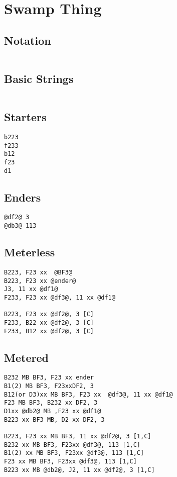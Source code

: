\documentclass[main.tex MB]{subfiles}
\begin{document}
\chapter{Swamp Thing}

\section{Notation}
\begin{lstlisting}[language=FG]
\end{lstlisting}


\section{Basic Strings}

\begin{lstlisting}[language=FG]
\end{lstlisting}

\section{Starters}
\begin{lstlisting}[language=FG]
b223
f233
b12
f23
d1
\end{lstlisting}

\section{Enders}

\begin{lstlisting}[language=FG]
@df2@ 3
@db3@ 113
\end{lstlisting}

\section{Meterless}


\begin{lstlisting}[language=FG]
B223, F23 xx  @BF3@
B223, F23 xx @ender@
J3, 11 xx @df1@
F233, F23 xx @df3@, 11 xx @df1@

B223, F23 xx @df2@, 3 [C]
F233, B22 xx @df2@, 3 [C]
F233, B12 xx @df2@, 3 [C]
\end{lstlisting}

\section{Metered}


\begin{lstlisting}[language=FG]
B232 MB BF3, F23 xx ender
B1(2) MB BF3, F23xxDF2, 3
B12(or D3)xx MB BF3, F23 xx  @df3@, 11 xx @df1@
F23 MB BF3, B232 xx DF2, 3
D1xx @db2@ MB ,F23 xx @df1@
B223 xx BF3 MB, D2 xx DF2, 3

B223, F23 xx MB BF3, 11 xx @df2@, 3 [1,C]
B232 xx MB BF3, F23xx @df3@, 113 [1,C]
B1(2) xx MB BF3, F23xx @df3@, 113 [1,C]
F23 xx MB BF3, F23xx @df3@, 113 [1,C]
B223 xx MB @db2@, J2, 11 xx @df2@, 3 [1,C]
\end{lstlisting}
\end{document}
